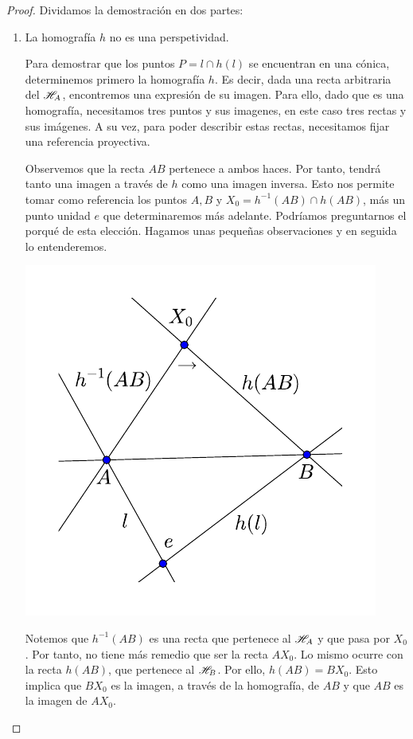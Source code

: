 \begin{proof}Dividamos la demostración en dos partes:
	\begin{enumerate}
		\item La homografía $h$ no es una perspetividad.
		
		Para demostrar que los puntos $P=l\cap h(l)$ se encuentran en una cónica, determinemos primero la homografía $h$. Es decir, dada una recta arbitraria del $\mathscr{H}_A$, encontremos una expresión de su imagen. Para ello, dado que es una homografía, necesitamos tres puntos y sus imagenes, en este caso tres rectas y sus imágenes. A su vez, para poder describir estas rectas, necesitamos fijar una referencia proyectiva.
		
		Observemos que la recta $AB$ pertenece a ambos haces. Por tanto, tendrá tanto una imagen a través de $h$ como una imagen inversa. Esto nos permite tomar como referencia los puntos $A,B$ y $X_0=h^{-1}(AB)\cap h(AB)$, más un punto unidad $e$ que determinaremos más adelante. Podríamos preguntarnos el porqué de esta elección. Hagamos unas pequeñas observaciones y en seguida lo entenderemos.
		 \begin{center}
		 	\includegraphics[scale=.8]{Graficos/Conicas/TeoremaSteiner1}
		 \end{center}
		Notemos que $h^{-1}(AB)$ es una recta que pertenece al $\mathscr{H}_A$ y que pasa por $X_0$. Por tanto, no tiene más remedio que ser la recta $AX_0$. Lo mismo ocurre con la recta $h(AB)$, que pertenece al $\mathscr{H}_B$. Por ello, $h(AB)=BX_0$. Esto implica que $BX_0$ es la imagen, a través de la homografía, de $AB$ y que $AB$ es la imagen de $AX_0$. 
		

\end{enumerate}
\end{proof}
